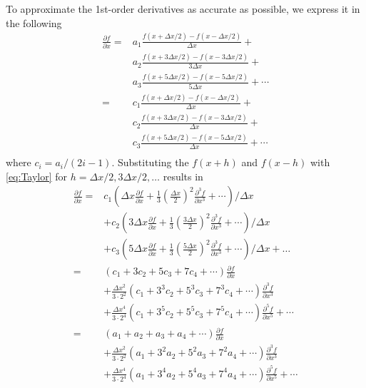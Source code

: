 To approximate the 1st-order derivatives as accurate as possible, we express it in the following
\begin{equation}
\begin{split}
\frac{\partial f}{\partial x}=&a_1\frac{f(x+\Delta x/2)-f(x-\Delta x/2)}{\Delta x}+\\
&a_2\frac{f(x+3\Delta x/2)-f(x-3\Delta x/2)}{3\Delta x}+\\
&a_3\frac{f(x+5\Delta x/2)-f(x-5\Delta x/2)}{5\Delta x}+\cdots\\
=&c_1\frac{f(x+\Delta x/2)-f(x-\Delta x/2)}{\Delta x}+\\
&c_2\frac{f(x+3\Delta x/2)-f(x-3\Delta x/2)}{\Delta x}+\\
&c_3\frac{f(x+5\Delta x/2)-f(x-5\Delta x/2)}{\Delta x}+\cdots\\
\end{split}
\end{equation}
where $c_i=a_i/(2i-1)$. Substituting the $f(x+h)$ and $f(x-h)$ with \eqref{eq:Taylor} for $h=\Delta x/2,3\Delta x/2, \ldots$ results in
\begin{equation}
\begin{split}
\frac{\partial f}{\partial x}=&c_1\left(\Delta x \frac{\partial f}{\partial x}+\frac{1}{3}(\frac{\Delta x}{2})^2\frac{\partial^3 f}{\partial x^3}+\cdots\right)/{\Delta x}\\
&+c_2\left(3\Delta x \frac{\partial f}{\partial x}+\frac{1}{3}(\frac{3\Delta x}{2})^2\frac{\partial^3 f}{\partial x^3}+\cdots\right)/{\Delta x}\\
&+c_3\left(5\Delta x \frac{\partial f}{\partial x}+\frac{1}{3}(\frac{5\Delta x}{2})^2\frac{\partial^3 f}{\partial x^3}+\cdots\right)/{\Delta x}+\ldots\\
=&(c_1+3c_2+5c_3+7c_4+\cdots)\frac{\partial f}{\partial x}\\
&+\frac{\Delta x^2}{3\cdot 2^2}(c_1+3^3c_2+5^3c_3+7^3c_4+\cdots)\frac{\partial^3 f}{\partial x^3}\\
&+\frac{\Delta x^4}{3\cdot 2^4}(c_1+3^5c_2+5^5c_3+7^5c_4+\cdots)\frac{\partial^5 f}{\partial x^5}+\cdots\\
=&(a_1+a_2+a_3+a_4+\cdots)\frac{\partial f}{\partial x}\\
&+\frac{\Delta x^2}{3\cdot 2^2}(a_1+3^2a_2+5^2a_3+7^2a_4+\cdots)\frac{\partial^3 f}{\partial x^3}\\
&+\frac{\Delta x^4}{3\cdot 2^4}(a_1+3^4a_2+5^4a_3+7^4a_4+\cdots)\frac{\partial^5 f}{\partial x^5}+\cdots\\
\end{split}
\end{equation}
